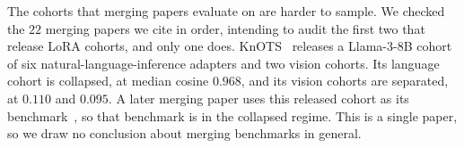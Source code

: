 The cohorts that merging papers evaluate on are harder to sample. We checked
the $22$ merging papers we cite in order, intending to audit the first two that
release LoRA cohorts, and only one does. KnOTS~\citep{stoica2025knots} releases
a Llama-3-8B cohort of six natural-language-inference adapters and two vision
cohorts. Its language cohort is collapsed, at median cosine $0.968$, and its
vision cohorts are separated, at $0.110$ and $0.095$. A later merging paper
uses this released cohort as its benchmark~\citep{panariello2025core}, so that
benchmark is in the collapsed regime. This is a single paper, so we draw no
conclusion about merging benchmarks in general.
